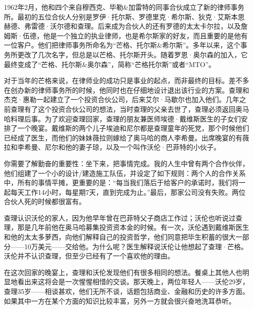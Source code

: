 1962年2月，他和四个来自穆西克、毕勒\&加雷特的同事合伙成立了新的律师事务所。最初的五位合伙人分别是罗伊·托尔斯、罗德里克·希尔斯、狄克·艾斯本思赫德、弗雷德·沃尔德和查理。后来成为合伙人的还有罗德的太太卡尔拉，以及詹姆斯·伍德，他是一个独立的执业律师，也是希尔斯家的好友，而且重要的是他有一位客户。他们把律师事务所命名为“芒格、托尔斯\&希尔斯”。多年以来，这个事务所更改了几次名字，但总是以芒格、托尔斯开头。随着罗恩·奥尔森的加入，它最终变成了“芒格、托尔斯\&奥尔森”，简称“芒格托尔斯”或者“MTO”。
\par

对于当年的芒格来说，在律师业的成功只是事业的起点，而非最终的目标。差不多在创办新的律师事务所的时候，他同时也在仔细地设计退出该行业的方案。查理和杰克·惠勒一起建立了一个投资合伙公司，后来艾尔·马歇尔也加入他们。几年之前查理有了这个投资合伙公司的想法，当时查理的父亲去世了，查理必须返回奥马哈料理后事。为了欢迎查理回家，查理的朋友兼医师埃德·戴维斯医生的子女们安排了一个晚宴。戴维斯的两个儿子埃迪和尼尔都是查理童年的死党，那个时候他们已经成了医生，而他们的妹妹薇拉则嫁给了奥马哈的商人李希曼。出席晚宴的有薇拉和李希曼、尼尔和他的妻子琼，以及一个叫作沃伦·巴菲特的小伙子。
\par

\begin{WisdomBox}
\par

你需要了解勤奋的重要性：坐下来，把事情完成。我的人生中曾有两个合作伙伴，他们组建了一个小的设计/建造施工队伍，并设定了如下规则：两个人的合作关系中，所有的事情平摊，更重要的是：“每当我们落后于给客户的承诺时，我们将一起每天工作14小时，每星期7天，直到完成为止。”最后，那家公司没有失败。两位合伙人死的时候都很富有。
\par
\end{WisdomBox}

查理认识沃伦的家人，因为他早年曾在巴菲特父子商店工作过；沃伦也听说过查理，那是几年前他在奥马哈募集投资资本金的时候。有一次，沃伦遇到戴维斯医生和他的太太多萝西，向他们解释自己的投资哲学，他们同意把毕生积蓄的很大一部分——10万美元——交给他。为什么呢？医生解释说沃伦让他想起了查理·芒格。沃伦并不认识查理，但至少已经有了一个喜欢他的理由。
\par

在这次回家的晚宴上，查理和沃伦发现他们有很多相同的想法。餐桌上其他人也明显地看出来这将会是一次惺惺相惜的交谈。那天晚上，两位年轻人——沃伦29岁，查理35岁——相谈甚欢，他们无所不谈，话题包括商业、金融和历史的许多方面。如果其中一方在某个方面的知识比较丰富，另外一方就会很兴奋地洗耳恭听。
\par

